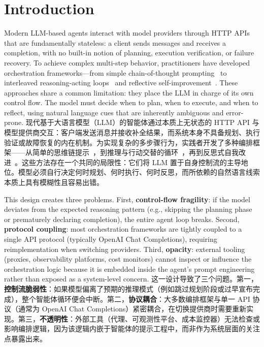 \section{Introduction}
\label{sec:intro}

Modern LLM-based agents interact with model providers through HTTP APIs that are fundamentally stateless: a client sends messages and receives a completion, with no built-in notion of planning, execution verification, or failure recovery. To achieve complex multi-step behavior, practitioners have developed orchestration frameworks---from simple chain-of-thought prompting~\citep{wei2022cot} to interleaved reasoning-acting loops~\citep{yao2022react} and reflective self-improvement~\citep{shinn2023reflexion,madaan2023selfrefine}. These approaches share a common limitation: they place the LLM in charge of its own control flow. The model must decide when to plan, when to execute, and when to reflect, using natural language cues that are inherently ambiguous and error-prone.
现代基于大语言模型（LLM）的智能体通过本质上无状态的 HTTP API 与模型提供商交互：客户端发送消息并接收补全结果，而系统本身不具备规划、执行验证或故障恢复的内在机制。为实现复杂的多步骤行为，实践者开发了多种编排框架——从简单的思维链提示~\citep{wei2022cot}，到推理与行动交替的循环~\citep{yao2022react}，再到反思式自我改进~\citep{shinn2023reflexion,madaan2023selfrefine}。这些方法存在一个共同的局限性：它们将 LLM 置于自身控制流的主导地位。模型必须自行决定何时规划、何时执行、何时反思，而所依赖的自然语言线索本质上具有模糊性且容易出错。

This design creates three problems. First, \textbf{control-flow fragility}: if the model deviates from the expected reasoning pattern (e.g., skipping the planning phase or prematurely declaring completion), the entire agent loop breaks. Second, \textbf{protocol coupling}: most orchestration frameworks are tightly coupled to a single API protocol (typically OpenAI Chat Completions), requiring reimplementation when switching providers. Third, \textbf{opacity}: external tooling (proxies, observability platforms, cost monitors) cannot inspect or influence the orchestration logic because it is embedded inside the agent's prompt engineering rather than exposed as a system-level concern.
这一设计导致了三个问题。第一，\textbf{控制流脆弱性}：如果模型偏离了预期的推理模式（例如跳过规划阶段或过早宣布完成），整个智能体循环便会中断。第二，\textbf{协议耦合}：大多数编排框架与单一 API 协议（通常为 OpenAI Chat Completions）紧密耦合，在切换提供商时需要重新实现。第三，\textbf{不透明性}：外部工具（代理、可观测性平台、成本监控器）无法检查或影响编排逻辑，因为该逻辑内嵌于智能体的提示工程中，而非作为系统层面的关注点暴露出来。

